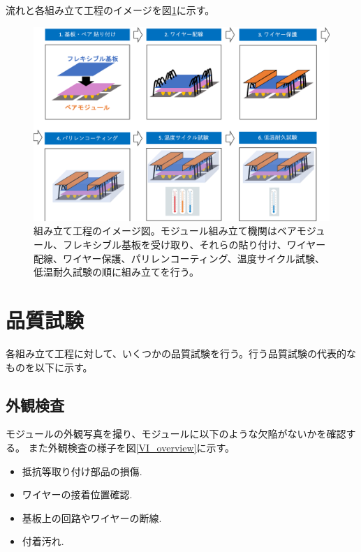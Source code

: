 流れと各組み立て工程のイメージを図\ref{assembly_flow}に示す。
\begin{figure}[bpt]\centering
\includegraphics[width=12cm]{assembly_flow}
\caption[組み立て工程のイメージ図]{組み立て工程のイメージ図。モジュール組み立て機関はベアモジュール、フレキシブル基板を受け取り、それらの貼り付け、ワイヤー配線、ワイヤー保護、パリレンコーティング、温度サイクル試験、低温耐久試験の順に組み立てを行う。}
\label{assembly_flow}
\end{figure}

\section{品質試験}
各組み立て工程に対して、いくつかの品質試験を行う。行う品質試験の代表的なものを以下に示す。

\subsection{外観検査}
モジュールの外観写真を撮り、モジュールに以下のような欠陥がないかを確認する。
また外観検査の様子を図\ref{VI_overview}に示す。
\begin{itemize}
  \item 抵抗等取り付け部品の損傷.
  \item ワイヤーの接着位置確認.
  \item 基板上の回路やワイヤーの断線.
  \item 付着汚れ.
\end{itemize}

